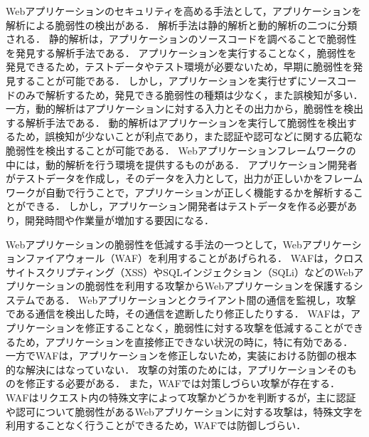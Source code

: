 \documentclass[submit]{ipsj}
\begin{document}
Webアプリケーションのセキュリティを高める手法として，アプリケーションを解析による脆弱性の検出がある．
解析手法は静的解析と動的解析の二つに分類される．
静的解析は，アプリケーションのソースコードを調べることで脆弱性を発見する解析手法である．
アプリケーションを実行することなく，脆弱性を発見できるため，テストデータやテスト環境が必要ないため，早期に脆弱性を発見することが可能である．
しかし，アプリケーションを実行せずにソースコードのみで解析するため，発見できる脆弱性の種類は少なく，また誤検知が多い．
一方，動的解析はアプリケーションに対する入力とその出力から，脆弱性を検出する解析手法である．
動的解析はアプリケーションを実行して脆弱性を検出するため，誤検知が少ないことが利点であり，また認証や認可などに関する広範な脆弱性を検出することが可能である．
Webアプリケーションフレームワークの中には，動的解析を行う環境を提供するものがある．
アプリケーション開発者がテストデータを作成し，そのデータを入力として，出力が正しいかをフレームワークが自動で行うことで，アプリケーションが正しく機能するかを解析することができる．
しかし，アプリケーション開発者はテストデータを作る必要があり，開発時間や作業量が増加する要因になる．

Webアプリケーションの脆弱性を低減する手法の一つとして，Webアプリケーションファイアウォール（WAF）\cite{waf}を利用することがあげられる．
WAFは，クロスサイトスクリプティング（XSS）やSQLインジェクション（SQLi）などのWebアプリケーションの脆弱性を利用する攻撃からWebアプリケーションを保護するシステムである．
Webアプリケーションとクライアント間の通信を監視し，攻撃である通信を検出した時，その通信を遮断したり修正したりする．
WAFは，アプリケーションを修正することなく，脆弱性に対する攻撃を低減することができるため，アプリケーションを直接修正できない状況の時に，特に有効である．
一方でWAFは，アプリケーションを修正しないため，実装における防御の根本的な解決にはなっていない．
攻撃の対策のためには，アプリケーションそのものを修正する必要がある．
また，WAFでは対策しづらい攻撃が存在する．
WAFはリクエスト内の特殊文字によって攻撃かどうかを判断するが，主に認証や認可について脆弱性があるWebアプリケーションに対する攻撃は，特殊文字を利用することなく行うことができるため，WAFでは防御しづらい．
\end{document}
